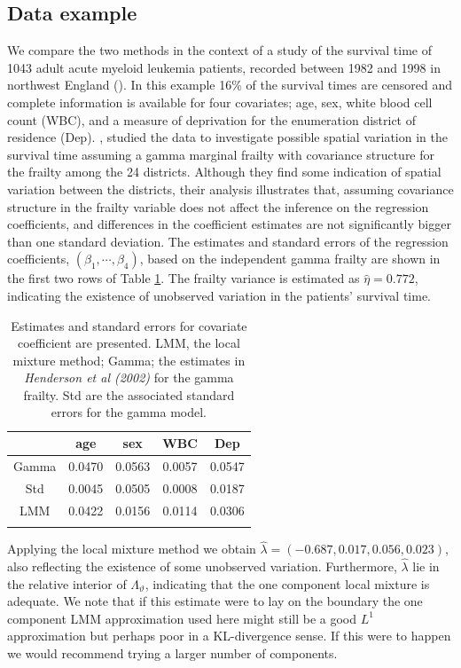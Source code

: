 \documentclass[graybox]{svmult}
\begin{document}
\subsection{Data example}\label{Example_survival}
We compare the two methods in the context of a study of  the survival time of 1043 adult acute myeloid leukemia patients, recorded
between 1982 and 1998 in northwest England (\cite{Henderson2002}). In this example 16\% of the survival times are censored and
complete information is available for four covariates; age, sex, white blood cell count (WBC), and a measure of
deprivation for the enumeration district of residence (Dep). \cite{Henderson2002}, studied the data to investigate possible
spatial variation in the survival time assuming a gamma marginal frailty with covariance structure for the frailty
among the 24 districts. Although they find some indication of spatial variation between the districts, their analysis
illustrates that, assuming covariance structure in the frailty variable does not affect the
inference on the regression coefficients, and differences in the coefficient estimates are not significantly bigger
than one standard deviation. The estimates and standard errors of the regression coefficients,  $(\beta_1,\cdots,\beta_4)$, based on the independent gamma frailty are shown in the first two rows of Table \ref{DataExample}. The frailty variance is estimated as $\hat{\eta}=0.772$,  indicating the
existence of unobserved variation in the patients' survival time.


\begin{table}
\caption{Estimates and standard errors for covariate coefficient are presented. LMM, the local mixture method; Gamma;
the estimates in \emph{Henderson et al (2002)} for the gamma frailty. Std are the associated standard errors for the gamma model.}
\label{DataExample}
\begin{center}
\begin{tabular}{c c c c c}
\hline
   &  age & sex & WBC & Dep \\ [0.3ex]
\hline
Gamma  & 0.0470 & 0.0563 & 0.0057 & 0.0547 \\
Std  & 0.0045 & 0.0505 & 0.0008 & 0.0187 \\ \hline
LMM  & 0.0422 & 0.0156 & 0.0114 & 0.0306 \\
\hline\\
\end{tabular}
\end{center}
\end{table}

Applying the local mixture method we obtain $\hat{\lambda}=(-0.687,0.017,0.056,0.023)$, also  reflecting  the existence
of some unobserved variation. Furthermore, $\hat{\lambda}$ lie in the relative interior of $\Lambda_\vartheta$, indicating that the  one component local mixture is adequate.  We note that if this estimate were to lay on the boundary the one component  LMM approximation used here might still be a good $L^1$ approximation but perhaps poor in  a KL-divergence sense. If this were to happen we would recommend trying a larger number of components.
\end{document}
